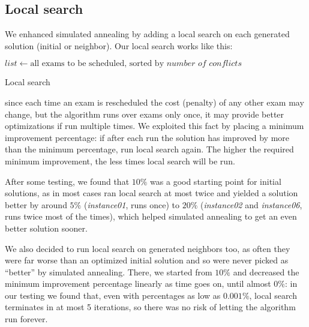 \documentclass[11pt, a4paper, leqno]{article}
\begin{document}
	\subsection{Local search}
	\label{local}
	
	We enhanced simulated annealing by adding a local search on each generated solution (initial or neighbor). Our local search works like this:
	
	\begin{algorithm}[H]
		$list \gets \text{all exams to be scheduled, sorted by }\textit{number of conflicts}$\;
		\caption{Local search}
	\end{algorithm}
	
	since each time an exam is rescheduled the cost (penalty) of any other exam may change, but the algorithm runs over exams only once, it may provide better optimizations if run multiple times. We exploited this fact by placing a minimum improvement percentage: if after each run the solution has improved by more than the minimum percentage, run local search again. The higher the required minimum improvement, the less times local search will be run.
	
	After some testing, we found that $10\%$ was a good starting point for initial solutions, as in most cases ran local search at most twice and yielded a solution better by around $5\%$ (\textit{instance01}, runs once) to $20\%$ (\textit{instance02} and \textit{instance06}, runs twice most of the times), which helped simulated annealing to get an even better solution sooner.
	
	We also decided to run local search on generated neighbors too, as often they were far worse than an optimized initial solution and so were never picked as ``better'' by simulated annealing. There, we started from $10\%$ and decreased the minimum improvement percentage linearly as time goes on, until almost $0\%$: in our testing we found that, even with percentages as low as $0.001\%$, local search terminates in at most 5 iterations, so there was no risk of letting the algorithm run forever.
	
\end{document}
